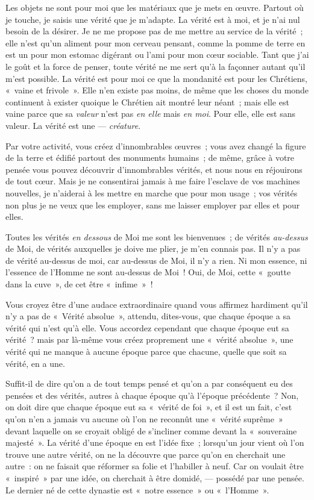 \documentclass[french,twoside]{book} %
\begin{document}
 Les objets ne sont pour moi que les matériaux que je mets en œuvre. Partout où je touche, je saisis une vérité que je m’adapte. La vérité est à moi, et je n’ai nul besoin de la désirer. Je ne me propose pas de me mettre au service de la vérité ; elle n’est qu’un aliment pour mon cerveau pensant, comme la pomme de terre en est un pour mon estomac digérant ou l’ami pour mon cœur sociable. Tant que j’ai le goût et la force de penser, toute vérité ne me sert qu’à la façonner autant qu’il m’est possible. La vérité est pour moi ce que la mondanité est pour les Chrétiens, « vaine et frivole ». Elle n’en existe pas moins, de même que les choses du monde continuent à exister quoique le Chrétien ait montré leur néant ; mais elle est vaine parce que sa \emph{valeur} n’est pas \emph{en elle} mais \emph{en moi}. Pour elle, elle est sans valeur. La vérité est une — \emph{créature}.\par
Par votre activité, vous créez d’innombrables œuvres ; vous avez changé la figure de la terre et édifié partout des monuments humains ; de même, grâce à votre pensée vous pouvez découvrir d’innombrables vérités, et nous nous en réjouirons de tout cœur. Mais je ne consentirai jamais à me faire l’esclave de vos machines nouvelles, je n’aiderai à les mettre en marche que pour mon usage ; vos vérités non plus je ne veux que les employer, sans me laisser employer par elles et pour elles.\par
Toutes les vérités \emph{en dessous} de Moi me sont les bienvenues ; de vérités \emph{au-dessus} de Moi, de vérités auxquelles je doive me plier, je m’en connais pas. Il n’y a pas de vérité au-dessus de moi, car au-dessus de Moi, il n’y a rien. Ni mon essence, ni l’essence de l’Homme ne sont au-dessus de Moi ! Oui, de Moi, cette « goutte dans la cuve », de cet être « infime » !\par
Vous croyez être d’une audace extraordinaire quand vous affirmez hardiment qu’il n’y a pas de « Vérité absolue », attendu, dites-vous, que chaque époque a sa vérité qui n’est qu’à elle. Vous accordez cependant  que chaque époque eut sa vérité ? mais par là-même vous créez proprement une « vérité absolue », une vérité qui ne manque à aucune époque parce que chacune, quelle que soit sa vérité, en a une.\par
Suffit-il de dire qu’on a de tout temps pensé et qu’on a par conséquent eu des pensées et des vérités, autres à chaque époque qu’à l’époque précédente ? Non, on doit dire que chaque époque eut sa « vérité de foi », et il est un fait, c’est qu’on n’en a jamais vu aucune où l’on ne reconnût une « vérité suprême » devant laquelle on se croyait obligé de s’incliner comme devant la « souveraine majesté ». La vérité d’une époque en est l’idée fixe ; lorsqu’un jour vient où l’on trouve une autre vérité, on ne la découvre que parce qu’on en cherchait une autre : on ne faisait que réformer sa folie et l’habiller à neuf. Car on voulait être « inspiré » par une idée, on cherchait à être domidé, — possédé par une pensée. Le dernier né de cette dynastie est « notre essence » ou « l’Homme ».\par
\end{document}
